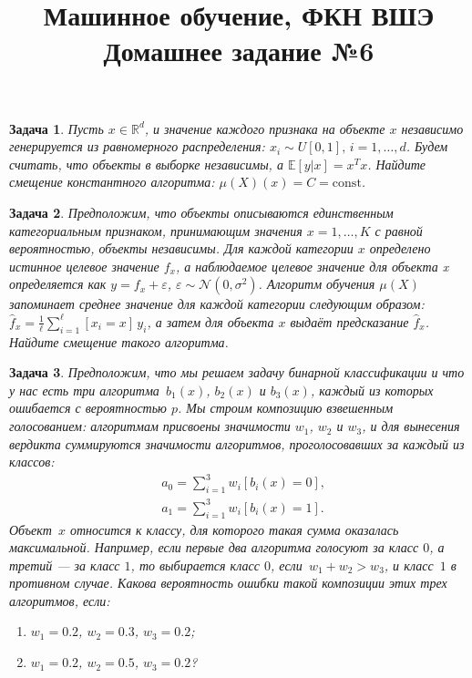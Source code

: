 \documentclass[12pt,fleqn]{article}
\title{Машинное обучение, ФКН ВШЭ\\Домашнее задание №6}
\author{}
\date{}
\newtheorem{esProblem}{Задача}
\begin{document}
    \maketitle
    
    \begin{esProblem}
        Пусть $x \in \mathbb{R}^d$, и значение каждого признака на объекте $x$ независимо генерируется из равномерного распределения: $x_i \sim U[0, 1], \, i = 1, \dots, d$. Будем считать, что объекты в выборке независимы, а $\mathbb{E}[y|x] = x^T x$. Найдите смещение константного алгоритма: $\mu(X)(x) = C = \text{const}$.    
        
    \end{esProblem}
    
    \begin{esProblem}
        Предположим, что объекты описываются единственным категориальным признаком, принимающим значения $x = 1, \dots, K$ с равной вероятностью, объекты независимы. Для каждой категории $x$ определено истинное целевое значение $f_x$, а наблюдаемое целевое значение для объекта x определяется как $y = f_x + \varepsilon$, $\varepsilon \sim \mathcal{N}(0, \sigma^2)$. Алгоритм обучения $\mu(X)$ запоминает среднее значение для каждой категории следующим образом: $\hat f_x = \frac 1 \ell \sum_{i=1}^\ell [x_i=x] \, y_i$, а затем для объекта $x$ выдаёт предсказание $\hat f_x$. Найдите смещение такого алгоритма.
        
    \end{esProblem}
    
    \begin{esProblem}
        Предположим, что мы решаем задачу бинарной классификации и что у нас есть три алгоритма~$b_1(x)$, $b_2(x)$ и $b_3(x)$,
        каждый из которых ошибается с вероятностью $p$.
        Мы строим композицию взвешенным голосованием: алгоритмам присвоены значимости $w_1$, $w_2$ и $w_3$,
        и для вынесения вердикта суммируются значимости алгоритмов, проголосовавших за каждый из классов:
        \begin{align*}
            &a_0 = \sum_{i = 1}^{3} w_i [b_i(x) = 0],\\
            &a_1 = \sum_{i = 1}^{3} w_i [b_i(x) = 1].
        \end{align*}
        Объект~$x$ относится к классу, для которого такая сумма оказалась максимальной.
        Например, если первые два алгоритма голосуют за класс $0$,
        а третий --- за класс $1$, то выбирается класс $0$, если~$w_1 + w_2 > w_3$, и класс~$1$ в противном случае.
        Какова вероятность ошибки такой композиции этих трех алгоритмов, если:
        \begin{enumerate}
            \item $w_1 = 0.2$, $w_2 = 0.3$, $w_3 = 0.2$;
            \item $w_1 = 0.2$, $w_2 = 0.5$, $w_3 = 0.2$?
        \end{enumerate}

    \end{esProblem}
\end{document}

